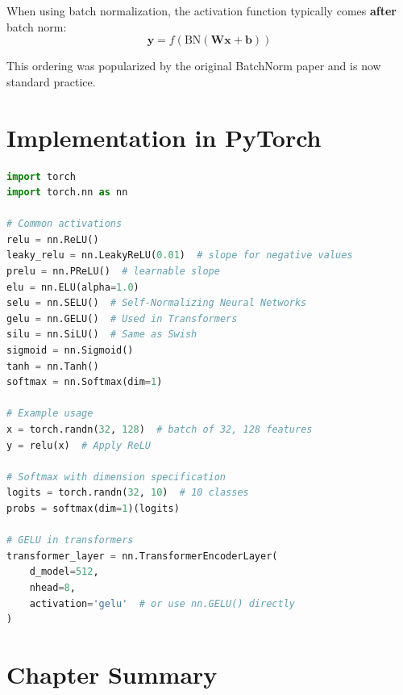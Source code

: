 When using batch normalization, the activation function typically comes \textbf{after} batch norm:
\begin{equation}
\mathbf{y} = f(\text{BN}(\mathbf{W}\mathbf{x} + \mathbf{b}))
\end{equation}

This ordering was popularized by the original BatchNorm paper and is now standard practice.

\section{Implementation in PyTorch}

\begin{code}
    \label{code:activations_pytorch}
\begin{lstlisting}[language=python]
import torch
import torch.nn as nn

# Common activations
relu = nn.ReLU()
leaky_relu = nn.LeakyReLU(0.01)  # slope for negative values
prelu = nn.PReLU()  # learnable slope
elu = nn.ELU(alpha=1.0)
selu = nn.SELU()  # Self-Normalizing Neural Networks
gelu = nn.GELU()  # Used in Transformers
silu = nn.SiLU()  # Same as Swish
sigmoid = nn.Sigmoid()
tanh = nn.Tanh()
softmax = nn.Softmax(dim=1)

# Example usage
x = torch.randn(32, 128)  # batch of 32, 128 features
y = relu(x)  # Apply ReLU

# Softmax with dimension specification
logits = torch.randn(32, 10)  # 10 classes
probs = softmax(dim=1)(logits)

# GELU in transformers
transformer_layer = nn.TransformerEncoderLayer(
    d_model=512, 
    nhead=8,
    activation='gelu'  # or use nn.GELU() directly
)
\end{lstlisting}
\end{code}

\section{Chapter Summary}

